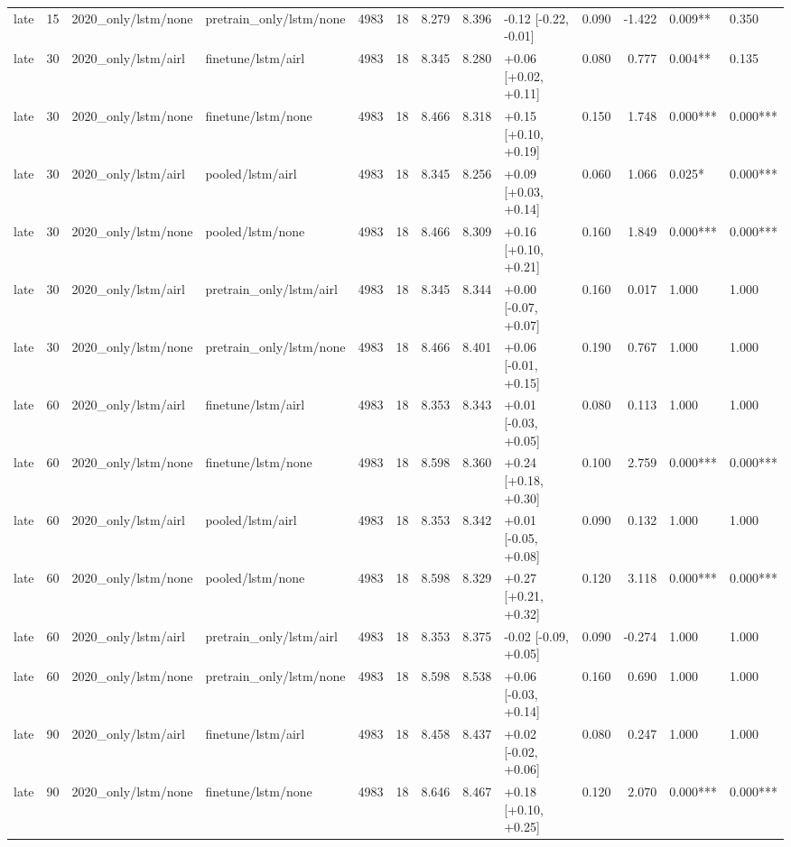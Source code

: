 \begin{tabular}{lrllrrrrlrrll}
late & 15 & 2020_only/lstm/none & pretrain_only/lstm/none & 4983 & 18 & 8.279 & 8.396 & -0.12 [-0.22, -0.01] & 0.090 & -1.422 & 0.009** & 0.350 \\
late & 30 & 2020_only/lstm/airl & finetune/lstm/airl & 4983 & 18 & 8.345 & 8.280 & +0.06 [+0.02, +0.11] & 0.080 & 0.777 & 0.004** & 0.135 \\
late & 30 & 2020_only/lstm/none & finetune/lstm/none & 4983 & 18 & 8.466 & 8.318 & +0.15 [+0.10, +0.19] & 0.150 & 1.748 & 0.000*** & 0.000*** \\
late & 30 & 2020_only/lstm/airl & pooled/lstm/airl & 4983 & 18 & 8.345 & 8.256 & +0.09 [+0.03, +0.14] & 0.060 & 1.066 & 0.025* & 0.000*** \\
late & 30 & 2020_only/lstm/none & pooled/lstm/none & 4983 & 18 & 8.466 & 8.309 & +0.16 [+0.10, +0.21] & 0.160 & 1.849 & 0.000*** & 0.000*** \\
late & 30 & 2020_only/lstm/airl & pretrain_only/lstm/airl & 4983 & 18 & 8.345 & 8.344 & +0.00 [-0.07, +0.07] & 0.160 & 0.017 & 1.000 & 1.000 \\
late & 30 & 2020_only/lstm/none & pretrain_only/lstm/none & 4983 & 18 & 8.466 & 8.401 & +0.06 [-0.01, +0.15] & 0.190 & 0.767 & 1.000 & 1.000 \\
late & 60 & 2020_only/lstm/airl & finetune/lstm/airl & 4983 & 18 & 8.353 & 8.343 & +0.01 [-0.03, +0.05] & 0.080 & 0.113 & 1.000 & 1.000 \\
late & 60 & 2020_only/lstm/none & finetune/lstm/none & 4983 & 18 & 8.598 & 8.360 & +0.24 [+0.18, +0.30] & 0.100 & 2.759 & 0.000*** & 0.000*** \\
late & 60 & 2020_only/lstm/airl & pooled/lstm/airl & 4983 & 18 & 8.353 & 8.342 & +0.01 [-0.05, +0.08] & 0.090 & 0.132 & 1.000 & 1.000 \\
late & 60 & 2020_only/lstm/none & pooled/lstm/none & 4983 & 18 & 8.598 & 8.329 & +0.27 [+0.21, +0.32] & 0.120 & 3.118 & 0.000*** & 0.000*** \\
late & 60 & 2020_only/lstm/airl & pretrain_only/lstm/airl & 4983 & 18 & 8.353 & 8.375 & -0.02 [-0.09, +0.05] & 0.090 & -0.274 & 1.000 & 1.000 \\
late & 60 & 2020_only/lstm/none & pretrain_only/lstm/none & 4983 & 18 & 8.598 & 8.538 & +0.06 [-0.03, +0.14] & 0.160 & 0.690 & 1.000 & 1.000 \\
late & 90 & 2020_only/lstm/airl & finetune/lstm/airl & 4983 & 18 & 8.458 & 8.437 & +0.02 [-0.02, +0.06] & 0.080 & 0.247 & 1.000 & 1.000 \\
late & 90 & 2020_only/lstm/none & finetune/lstm/none & 4983 & 18 & 8.646 & 8.467 & +0.18 [+0.10, +0.25] & 0.120 & 2.070 & 0.000*** & 0.000*** \\

\end{tabular}
